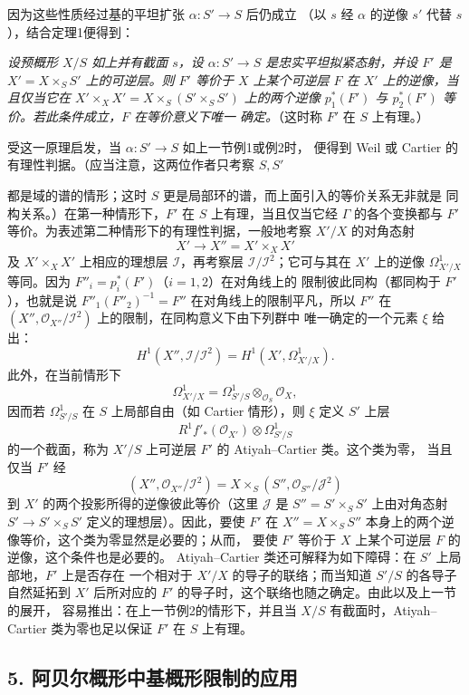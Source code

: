 因为这些性质经过基的平坦扩张 $\alpha:S'\longrightarrow S$ 后仍成立
（以 $s$ 经 $\alpha$ 的逆像 $s'$ 代替 $s$），结合定理1便得到：

\emph{设预概形 $X/S$ 如上并有截面 $s$，设
$\alpha:S'\longrightarrow S$ 是忠实平坦拟紧态射，并设 $F'$ 是
$X'=X\times_SS'$ 上的可逆层。则 $F'$ 等价于 $X$ 上某个可逆层 $F$ 在
$X'$ 上的逆像，当且仅当它在
$X'\times_XX'=X\times_S(S'\times_SS')$ 上的两个逆像
$p_1^*(F')$ 与 $p_2^*(F')$ 等价。若此条件成立，$F$ 在等价意义下唯一
确定。}（这时称 $F'$ 在 $S$ 上有理。）

受这一原理启发，当 $\alpha:S'\longrightarrow S$ 如上一节例1或例2时，
便得到 Weil 或 Cartier 的有理性判据。（应当注意，这两位作者只考察
$S,S'$

都是域的谱的情形；这时 $S$ 更是局部环的谱，而上面引入的等价关系无非就是
同构关系。）在第一种情形下，$F'$ 在 $S$ 上有理，当且仅当它经 $\Gamma$
的各个变换都与 $F'$ 等价。为表述第二种情形下的有理性判据，一般地考察
$X'/X$ 的对角态射
\[
  X'\longrightarrow X''=X'\times_XX'
\]
及 $X'\times_XX'$ 上相应的理想层 $\mathcal I$，再考察层
$\mathcal I/\mathcal I^2$；它可与其在 $X'$ 上的逆像
$\Omega^1_{X'/X}$ 等同。因为 $F''_i=p_i^*(F')$（$i=1,2$）在对角线上的
限制彼此同构（都同构于 $F'$），也就是说
$F''_1(F''_2)^{-1}=F''$ 在对角线上的限制平凡，所以 $F''$ 在
$(X'',\mathcal O_{X''}/\mathcal I^2)$ 上的限制，在同构意义下由下列群中
唯一确定的一个元素 $\xi$ 给出：
\[
  H^1(X'',\mathcal I/\mathcal I^2)
  =H^1(X',\Omega^1_{X'/X}).
\]
此外，在当前情形下
\[
  \Omega^1_{X'/X}
  =\Omega^1_{S'/S}\otimes_{\mathcal O_S}\mathcal O_X,
\]
因而若 $\Omega^1_{S'/S}$ 在 $S$ 上局部自由（如 Cartier 情形），则 $\xi$
定义 $S'$ 上层
\[
  R^1f'_*(\mathcal O_{X'})\otimes\Omega^1_{S'/S}
\]
的一个截面，称为 $X'/S$ 上可逆层 $F'$ 的 Atiyah--Cartier 类。这个类为零，
当且仅当 $F'$ 经
\[
  (X'',\mathcal O_{X''}/\mathcal I^2)
  =X\times_S(S'',\mathcal O_{S''}/\mathcal J^2)
\]
到 $X'$ 的两个投影所得的逆像彼此等价（这里 $\mathcal J$ 是
$S''=S'\times_SS'$ 上由对角态射
$S'\longrightarrow S'\times_SS'$ 定义的理想层）。因此，要使 $F'$ 在
$X''=X\times_SS''$ 本身上的两个逆像等价，这个类为零显然是必要的；从而，
要使 $F'$ 等价于 $X$ 上某个可逆层 $F$ 的逆像，这个条件也是必要的。
Atiyah--Cartier 类还可解释为如下障碍：在 $S'$ 上局部地，$F'$ 上是否存在
一个相对于 $X'/X$ 的导子的联络；而当知道 $S'/S$ 的各导子自然延拓到
$X'$ 后所对应的 $F'$ 的导子时，这个联络也随之确定。由此以及上一节的展开，
容易推出：在上一节例2的情形下，并且当 $X/S$ 有截面时，Atiyah--Cartier
类为零也足以保证 $F'$ 在 $S$ 上有理。

\subsection*{5. 阿贝尔概形中基概形限制的应用}

